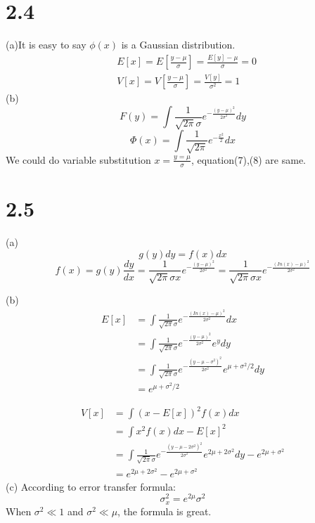 \documentclass{article}
\begin{document}
\begin{CJK*}{GBK}{song}
\section{2.4}
(a)It is easy to say $\phi(x)$ is a Gaussian distribution.
\begin{equation}
\begin{aligned}
&E[x]=E[\frac{y-\mu}{\sigma}]=\frac{E[y]-\mu}{\sigma}=0\\
&V[x]=V[\frac{y-\mu}{\sigma}]=\frac{V[y]}{\sigma^2}=1
\end{aligned}
\end{equation}
(b)
\begin{equation}
F(y)=\int\frac{1}{\sqrt{2\pi}\sigma}e^{-\frac{(y-\mu)^2}{2\sigma^2}}dy
\end{equation}
\begin{equation}
\Phi(x)=\int\frac{1}{\sqrt{2\pi}}e^{-\frac{x^2}{2}}dx
\end{equation}
We could do variable substitution $x=\frac{y=\mu}{\sigma}$, equation(7),(8) are same.

\section{2.5}
(a)
\begin{equation}
g(y)dy=f(x)dx
\end{equation}
\begin{equation}
f(x)=g(y)\frac{dy}{dx}=\frac{1}{\sqrt{2\pi}\sigma x}e^{-\frac{(y-\mu)^2}{2\sigma^2}}=\frac{1}{\sqrt{2\pi}\sigma x}e^{-\frac{(In(x)-\mu)^2}{2\sigma^2}}
\end{equation}

(b)
\begin{equation}
\begin{aligned}
E[x]&=\int\frac{1}{\sqrt{2\pi}\sigma}e^{-\frac{(In(x)-\mu)^2}{2\sigma^2}}dx\\
&=\int\frac{1}{\sqrt{2\pi}\sigma}e^{-\frac{(y-\mu)^2}{2\sigma^2}}e^ydy\\
&=\int\frac{1}{\sqrt{2\pi}\sigma}e^{-\frac{(y-\mu-\sigma^2)^2}{2\sigma^2}}e^{\mu+\sigma^2/2}dy\\
&=e^{\mu+\sigma^2/2}
\end{aligned}
\end{equation}

\begin{equation}
\begin{aligned}
V[x]&=\int(x-E[x])^2f(x)dx\\
&=\int x^2f(x)dx-E[x]^2\\
&=\int\frac{1}{\sqrt{2\pi}\sigma}e^{-\frac{(y-\mu-2\sigma^2)^2}{2\sigma^2}}e^{2\mu+2\sigma^2}dy-e^{2\mu+\sigma^2}\\
&=e^{2\mu+2\sigma^2}-e^{2\mu+\sigma^2}
\end{aligned}
\end{equation}
(c)
According to error transfer formula:
\begin{equation}
\sigma_x^2=e^{2\mu}\sigma^2
\end{equation}
When $\sigma^2\ll1$ and $\sigma^2\ll\mu$, the formula is great.




\end{CJK*}
\end{document}
